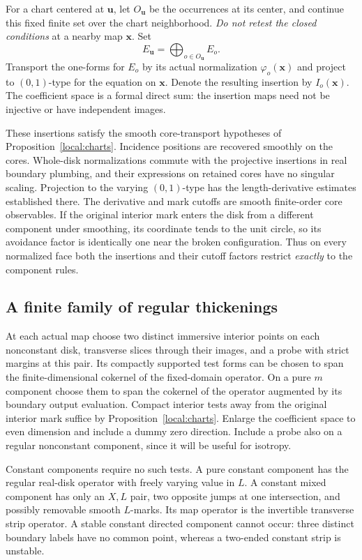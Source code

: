 For a chart centered at $\mathbf u$, let $O_{\mathbf u}$ be the occurrences
at its center, and continue this fixed finite set over the chart
neighborhood.  \emph{Do not retest the closed conditions} at a nearby
map $\mathbf x$.  Set
\[
 E_{\mathbf u}=\bigoplus_{o\in O_{\mathbf u}}E_o.
\]
Transport the one-forms for $E_o$ by its actual normalization
$\varphi_o(\mathbf x)$ and project to $(0,1)$-type for the equation on
$\mathbf x$.  Denote the resulting insertion by $I_o(\mathbf x)$.
The coefficient space is a formal direct sum: the insertion maps need
not be injective or have independent images.

These insertions satisfy the smooth core-transport hypotheses of
Proposition~\ref{local:charts}.  Incidence positions are recovered smoothly on
the cores.  Whole-disk normalizations commute with the projective
insertions in real boundary plumbing, and their expressions on retained
cores have no singular scaling.  Projection to the varying $(0,1)$-type
has the length-derivative estimates established there.  The derivative
and mark cutoffs are smooth finite-order core observables.  If the
original interior mark enters the disk from a different component under
smoothing, its coordinate tends to the unit circle, so its avoidance
factor is identically one near the broken configuration.  Thus on every
normalized face both the insertions and their cutoff factors restrict
\emph{exactly} to the component rules.

\subsection{A finite family of regular thickenings}

At each actual map choose two distinct immersive interior points on each
nonconstant disk, transverse slices through their images, and a probe
with strict margins at this pair.  Its compactly supported test forms
can be chosen to span the finite-dimensional cokernel of the fixed-domain
operator.  On a pure $m$ component choose them to span the cokernel of
the operator augmented by its boundary output evaluation.  Compact
interior tests away from the original interior mark suffice by
Proposition~\ref{local:charts}.  Enlarge the coefficient space to even dimension
and include a dummy zero direction.  Include a probe also on a regular
nonconstant component, since it will be useful for isotropy.

Constant components require no such tests.  A pure constant component
has the regular real-disk operator with freely varying value in $L$.
A constant mixed component has only an $X,L$ pair, two opposite jumps
at one intersection, and possibly removable smooth $L$-marks.  Its
map operator is the invertible transverse strip operator.  A stable
constant directed component cannot occur: three distinct boundary labels
have no common point, whereas a two-ended constant strip is unstable.

